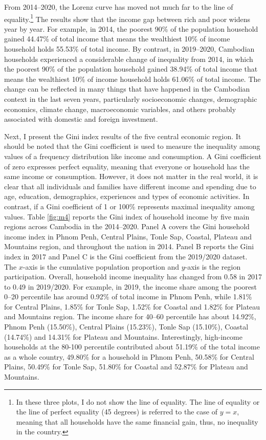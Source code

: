 \documentclass[11pt,letterpaper]{article}
\begin{document}


From 2014--2020, the Lorenz curve has moved not much far to the line of equality.\footnote{In these three plots, I do not show the line of equality. The line of equality or the line of perfect equality (45 degrees) is referred to the case of $y=x$, meaning that all households have the same financial gain, thus, no inequality in the country.}  The results show that the income gap between rich and poor widens year by year. For example, in 2014,  the poorest 90\% of the population household gained 44.47\% of total income that means the wealthiest 10\% of income household holds 55.53\% of total income. By contrast, in 2019--2020, Cambodian households experienced a considerable change of inequality from 2014, in which the poorest 90\% of the population household gained 38.94\% of total income that means the wealthiest 10\% of income household holds 61.06\% of total income. The change can be reflected in many things that have happened in the Cambodian context in the last seven years, particularly socioeconomic changes, demographic economics, climate change, macroeconomic variables, and others probably associated with domestic and foreign investment. 

Next, I present the Gini index results of the five central economic region. It should be noted that the Gini coefficient is used to measure the inequality among values of a frequency distribution like income and consumption. A Gini coefficient of zero expresses perfect equality, meaning that everyone or household has the same income or consumption. However, it does not matter in the real world, it is clear that all individuals and families have different income and spending due to age, education, demographics, experiences and types of economic activities. In contrast, if a Gini coefficient of 1 or 100\% represents maximal inequality among values. Table \ref{fig:m4} reports the Gini index of household income by five main regions across Cambodia in the 2014--2020. Panel A covers the Gini household income index in Phnom Penh, Central Plains, Tonle Sap, Coastal, Plateau and Mountains region, and throughout the nation in 2014. Panel B reports the Gini index in 2017 and Panel C is the Gini coefficient from the 2019/2020 dataset. The $x$-axis is the cumulative population proportion and $y$-axis is the region participation. Overall, household income inequality has changed from 0.58 in 2017 to 0.49 in 2019/2020. For example, in 2019, the income share among the poorest 0--20 percentile has around 0.92\% of total income in Phnom Penh, while 1.81\% for Central Plains, 1.85\% for Tonle Sap, 1.52\% for Coastal and 1.82\% for Plateau and Mountains region. The income share for 40--60 percentile has about 14.92\%, Phnom Penh (15.50\%), Central Plains (15.23\%), Tonle Sap (15.10\%), Coastal (14.74\%) and 14.31\% for Plateau and Mountains. Interestingly, high-income households at the 80-100 percentile contributed about 51.19\% of the total income as a whole country, 49.80\% for a household in Phnom Penh, 50.58\% for Central Plains, 50.49\% for Tonle Sap, 51.80\% for Coastal and 52.87\% for Plateau and Mountains.
\end{document}
